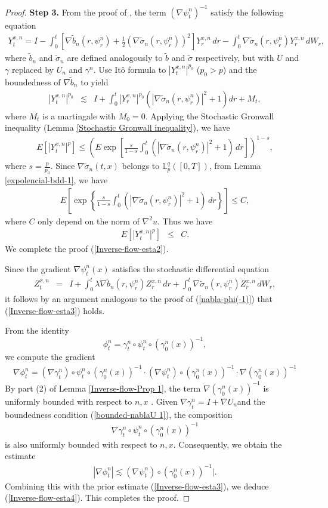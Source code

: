 \documentclass[12pt,oneside, reqno]{amsart}
\newcommand{\be}{\begin{eqnarray}}
\newcommand{\ee}{\end{eqnarray}}
\newcommand{\ce}{\begin{eqnarray*}}
\newcommand{\de}{\end{eqnarray*}}
\def\mL{{\mathbb L}}
\def\leq{\leqslant}
\numberwithin{equation}{section}
\begin{document}
\begin{proof}
	\textbf{Step 3.} From the proof of \cite[Theorem 4.4]{Kunita1984}, the term $(\nabla \psi_t^n )^{-1}$ satisfy the following equation 
	\ce 
	Y_t^{x,n}=I-\int_0^t\left[\nabla \tilde{b}_n(r,\psi_r^n)+\frac{1}{2}(\nabla \tilde{\sigma}_n(r,\psi_r^n) )^2\right] 	Y_r^{x,n}\,dr-\int_0^t \nabla \tilde{\sigma}_n(r,\psi_r^n)	Y_r^{x,n}\,dW_r,
	\de 
	where $\tilde{b}_n$ and $\tilde{\sigma}_n$ are defined analogously to $\tilde{b}$ and $\tilde{\sigma}$ respectively, but with $U$ and $\gamma$ replaced by $U_n$ and $\gamma^n$.  
	Use It\^{o} formula to $|Y_t^{x,n}|^{p_0}$ ($p_0>p$) and the boundedness of $\nabla\tilde{b}_n$  to yield
	\ce 
	|Y_t^{x,n}|^{p_0}&\lesssim & I+ \int_0^t|Y_r^{x,n}|^{p_0}(|\nabla \tilde{\sigma}_n(r,\psi_r^n) |^2+1)dr+M_t, 
	\de 
	where $M_t$ is a martingale with $M_0=0$.  Applying the Stochastic Gronwall inequality (Lemma \ref{Stochastic Gronwall inequality}), we have 
	\ce 
	E[|Y_t^{x,n}|^{p}]\leq \left(E \exp\left[\frac{s }{1-s}\int_0^t \left(|\nabla \tilde{\sigma}_n(r,\psi_r^n)|^2+1\right)\,dr \right]\right)^{1-s},
	\de 
	where $s=\frac{p}{p_0}$.
	Since $\nabla \tilde{\sigma}_n(t,x)$ belongs to $\mL_p^q([0,T])$, from Lemma \ref{expolencial-bdd-1}, we have 
	\be\label{bd-expl-1} 
	E\left[\exp\left\{\frac{s }{1-s}\int_0^t \left(|\nabla \tilde{\sigma}_n(r,\psi_r^n)|^2+1\right)\,dr\right\}\right]\leq C,
	\ee 
	 where $C$ only depend on the norm of $\nabla ^2 u$. Thus we have 
	\be \label{nabla-phi(-1)}
	E[|Y_t^{x,n}|^p]&\leq& C.
	\ee 
	 We complete the proof (\ref{Inverse-flow-esta2}). 
	
	Since the gradient $\nabla \psi_t^{n}(x)$  satisfies the stochastic differential equation
	\ce 
    Z_t^{x,n}&=&I+\int_0^t\lambda\nabla \tilde{b}_n(r,\psi_r^n)	Z_r^{x,n}\,dr+\int_0^t \nabla \tilde{\sigma}_n(r,\psi_r^n)	Z_r^{x,n}\,dW_r,
	\de 
 it follows by an argument analogous to the proof of  (\ref{nabla-phi(-1)}) that  (\ref{Inverse-flow-esta3}) holds.
	
From the identity $$\phi_t^n=\gamma_t^n \circ \psi_t^n\circ (\gamma_0^n(x))^{-1},$$ we compute the gradient
	\ce
	\nabla\phi_t^n=(\nabla \gamma_t^n) \circ\psi_t^n\circ (\gamma_0^n(x))^{-1} \cdot (\nabla \psi_t^n)\circ (\gamma_0^n(x))^{-1}\cdot \nabla (\gamma_0^n(x))^{-1}
	\de 
By part (2) of Lemma \ref{Inverse-flow-Prop 1}, the term $\nabla (\gamma_0^n(x))^{-1}$ is uniformly bounded with respect to $n,x$ . Given $\nabla \gamma_t^n=I+\nabla U_n$and the boundedness condition  (\ref{bounded-nablaU 1}), the composition
	\ce 
	\nabla \gamma_t^n \circ \psi_t^n\circ (\gamma_0^n(x))^{-1}
	\de 
is also uniformly bounded with respect to $n,x$. Consequently, we obtain the estimate
	\ce
	|\nabla\phi_t^n|\lesssim  (\nabla \psi_t^n)\circ (\gamma_0^n(x))^{-1}|.
	\de 
Combining this with the prior estimate (\ref{Inverse-flow-esta3}), we deduce (\ref{Inverse-flow-esta4}). This completes the proof.
\end{proof}
\end{document}
